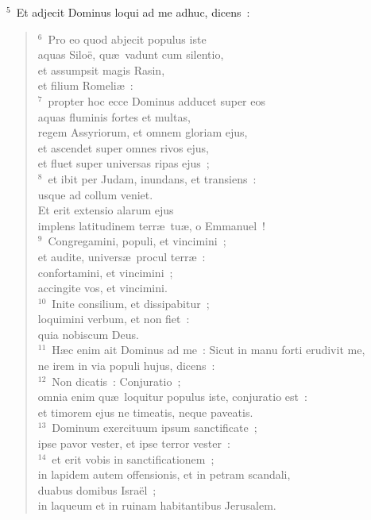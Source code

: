 ${}^{5}$~Et adjecit Dominus loqui ad me adhuc, dicens~:
\begin{flushleft}\begin{verse}${}^{6}$~Pro eo quod abjecit populus iste\\ aquas Silo\"e, qu\ae\ vadunt cum silentio,\\ et assumpsit magis Rasin,\\ et filium Romeli\ae~:\\
${}^{7}$~propter hoc ecce Dominus adducet super eos\\ aquas fluminis fortes et multas,\\ regem Assyriorum, et omnem gloriam ejus,\\ et ascendet super omnes rivos ejus,\\ et fluet super universas ripas ejus~;\\
${}^{8}$~et ibit per Judam, inundans, et transiens~:\\ usque ad collum veniet.\\ Et erit extensio alarum ejus\\ implens latitudinem terr\ae\ tu\ae , o Emmanuel~!\\
${}^{9}$~Congregamini, populi, et vincimini~;\\ et audite, univers\ae\ procul terr\ae~:\\ confortamini, et vincimini~;\\ accingite vos, et vincimini.\\
${}^{10}$~Inite consilium, et dissipabitur~;\\ loquimini verbum, et non fiet~:\\ quia nobiscum Deus.\\
${}^{11}$~H\ae c enim ait Dominus ad me~: Sicut in manu forti erudivit me,\\ ne irem in via populi hujus, dicens~:\\
${}^{12}$~Non dicatis~: Conjuratio~;\\ omnia enim qu\ae\ loquitur populus iste, conjuratio est~:\\ et timorem ejus ne timeatis, neque paveatis.\\
${}^{13}$~Dominum exercituum ipsum sanctificate~;\\ ipse pavor vester, et ipse terror vester~:\\
${}^{14}$~et erit vobis in sanctificationem~;\\ in lapidem autem offensionis, et in petram scandali,\\ duabus domibus Isra\"el~;\\ in laqueum et in ruinam habitantibus Jerusalem.\\

\end{verse}
\end{flushleft}
